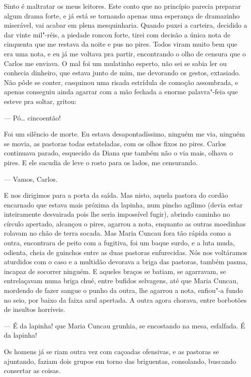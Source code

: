 \begin{linenumbers}
Sinto é maltratar os meus leitores. Este conto que no princípio parecia
preparar algum drama forte, e já está se tornando apenas uma esperança
de dramazinho miserável, vai acabar em plena mesquinharia. Quando puxei
a carteira, decidido a dar vinte mil"-réis, a piedade roncou forte, tirei
com decisão a única nota de cinquenta que me restava da noite e pus no
pires. Todos viram muito bem que era uma nota, e eu já me voltava pra
partir, encontrando o olho de censura que o Carlos me enviava. O mal foi
um mulatinho esperto, não sei se sabia ler ou conhecia dinheiro, que
estava junto de mim, me devorando os gestos, extasiado. Não pôde se
conter, casquinou uma risada estrídula de comoção assombrada, e apenas
conseguiu ainda agarrar com a mão fechada a enorme palavra"-feia que
esteve pra soltar, gritou:

--- Pó\ldots{} cincoentão!

Foi um silêncio de morte. Eu estava desapontadíssimo, ninguém me via,
ninguém se movia, as pastoras todas estateladas, com os olhos fixos no
pires. Carlos continuava parado, esquecido da Diana que também não o via
mais, olhava o pires. E ele sacudia de leve o rosto para os lados, me
censurando.

--- Vamos, Carlos.

E nos dirigimos para a porta da saída. Mas nisto, aquela pastora do
cordão encarnado que estava mais próxima da lapinha, num pincho agílimo
(devia estar inteiramente desvairada pois lhe seria impossível fugir),
abrindo caminho no círculo apertado, alcançou o pires, agarrou a nota,
enquanto as outras moedinhas rolavam no chão de terra socada. Mas Maria
Cuncau fora tão rápida como a outra, encontrara de peito com a fugitiva,
foi um baque surdo, e a luta muda, odienta, cheia de guinchos entre as
duas pastoras enfurecidas. Nós nos voltáramos aturdidos com o caso e a
multidão devorava a briga das pastoras, também pasma, incapaz de
socorrer ninguém. E aqueles braços se batiam, se agarravam, se
entrelaçavam numa briga chué, entre bufidos selvagens, até que Maria
Cuncau, mordendo de fazer sangue o punho da outra, lhe agarrou a nota,
enfiou"-a fundo no seio, por baixo da faixa azul apertada. A outra agora
chorava, entre borbotões de insultos horríveis.

--- É da lapinha! que Maria Cuncau grunhia, se encostando na mesa,
esfalfada. É da lapinha!

Os homens já se riam outra vez com caçoadas ofensivas, e as pastoras se
ajuntando, faziam dois grupos em torno das briguentas, consolando,
buscando consertar as coisas.


\end{linenumbers}
